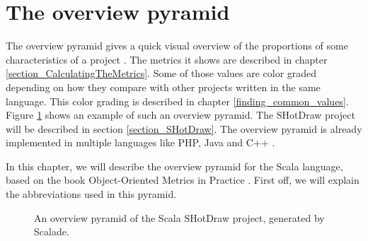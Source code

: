 \documentclass[onecolumn]{article}
\let\oldsection\section
\renewcommand\section{\clearpage\oldsection}
\begin{document}
\section{The overview pyramid} \label{section_the_overview_pyramid}
The overview pyramid gives a quick visual overview of the proportions of some characteristics of a project \cite{lanza2007objectOverviewPyramid}. The metrics it shows are described in chapter \ref{section_CalculatingTheMetrics}.
Some of those values are color graded depending on how they compare with other projects written in the same language. This color grading is described in chapter \ref{finding_common_values}.
Figure \ref{fig:pyramid_SHotDraw} shows an example of such an overview pyramid. The SHotDraw project will be described in section \ref{section_SHotDraw}. The overview pyramid is already implemented in multiple languages like PHP, Java and C++ \cite{Marek2010MetricsOOSoftware} \cite{Marinescu05iplasma}.

In this chapter, we will describe the overview pyramid for the Scala language, based on the book Object-Oriented Metrics in Practice \cite{lanza2007object}. First off, we will explain the abbreviations used in this pyramid. 

\begin{figure}[H]
  \centering
  
  \caption{An overview pyramid of the Scala SHotDraw project, generated by Scalade.}
  \label{fig:pyramid_SHotDraw}
\end{figure}
\end{document}
